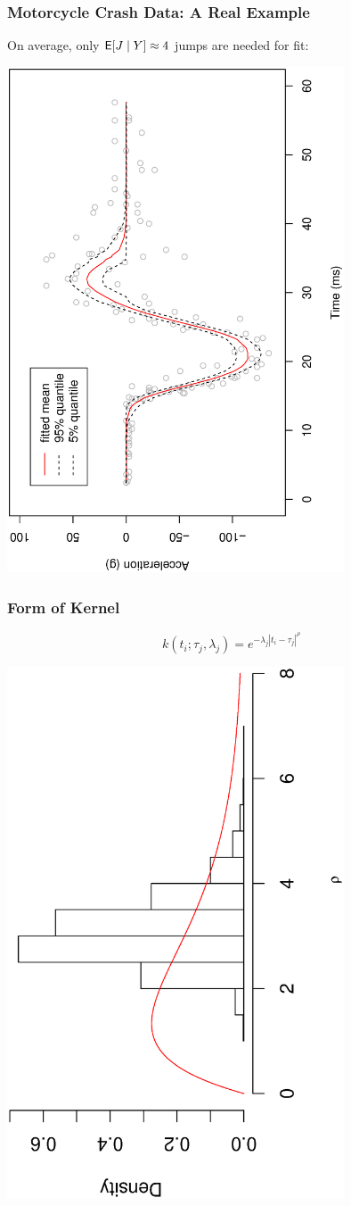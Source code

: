 \documentclass[handout]{beamer}
\newcommand{\bs}[2]{\begin{frame} \frametitle{#1}
{#2}
\end{frame} }
\begin{document}
\bs{ Motorcycle Crash Data: A Real Example}{
On average, only ${\sf{E}}[J\mid Y]\approx 4$ jumps are needed for fit:\par
    \includegraphics[angle=270,origin=l, clip=1,
     totalheight=6truecm,width=10cm]{motorfitted.ps}
}

\bs{Form of Kernel} {
\[k(t_i; \tau_j, \lambda_j) = e^{-\lambda_j |t_i - \tau_j|^\rho}\]

    \includegraphics[angle=270,origin=l, clip=1,
     totalheight=6truecm,width=10cm]{motor-rho.ps}
}
\end{document}
